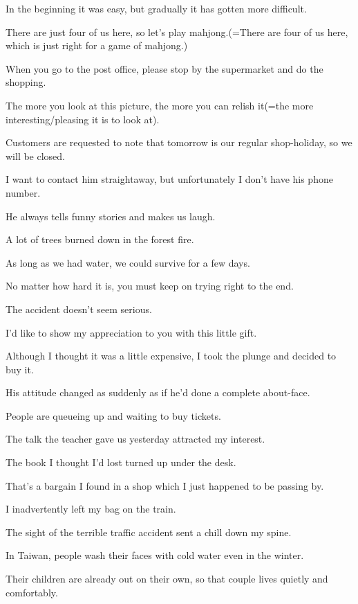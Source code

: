 \item[43.] In the beginning it was easy, but gradually it has gotten more difficult.
\item[44.] There are just four of us here, so let's play mahjong.(=There are four of us here, which is just right for a game of mahjong.)
\item[45.] When you go to the post office, please stop by the supermarket and do the shopping.
\item[46.] The more you look at this picture, the more you can relish it(=the more interesting/pleasing it is to look at).
\item[47.] Customers are requested to note that tomorrow is our regular shop-holiday, so we will be closed.
\item[48.] I want to contact him straightaway, but unfortunately I don't have his phone number.
\item[49.] He always tells funny stories and makes us laugh.
\item[50.] A lot of trees burned down in the forest fire.
\item[51.] As long as we had water, we could survive for a few days.
\item[52.] No matter how hard it is, you must keep on trying right to the end.
\item[53.] The accident doesn't seem serious.
\item[54.] I'd like to show my appreciation to you with this little gift.
\item[55.] Although I thought it was a little expensive, I took the plunge and decided to buy it.
\item[56.] His attitude changed as suddenly as if he'd done a complete about-face.
\item[57.] People are queueing up and waiting to buy tickets.
\item[58.] The talk the teacher gave us yesterday attracted my interest.
\item[59.] The book I thought I'd lost turned up under the desk.
\item[60.] That's a bargain I found in a shop which I just happened to be passing by.
\item[61.] I inadvertently left my bag on the train.
\item[62.] The sight of the terrible traffic accident sent a chill down my spine.
\item[63.] In Taiwan, people wash their faces with cold water even in the winter.
\item[64.] Their children are already out on their own, so that couple lives quietly and comfortably.
